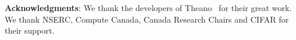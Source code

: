 \documentclass{article} %
\begin{document}


{\bf Acknowledgments}: We thank the developers of
Theano~\cite{Fred2010} for %
their great work. We thank NSERC, Compute Canada, Canada Research Chairs and CIFAR for their support.



\end{document}
